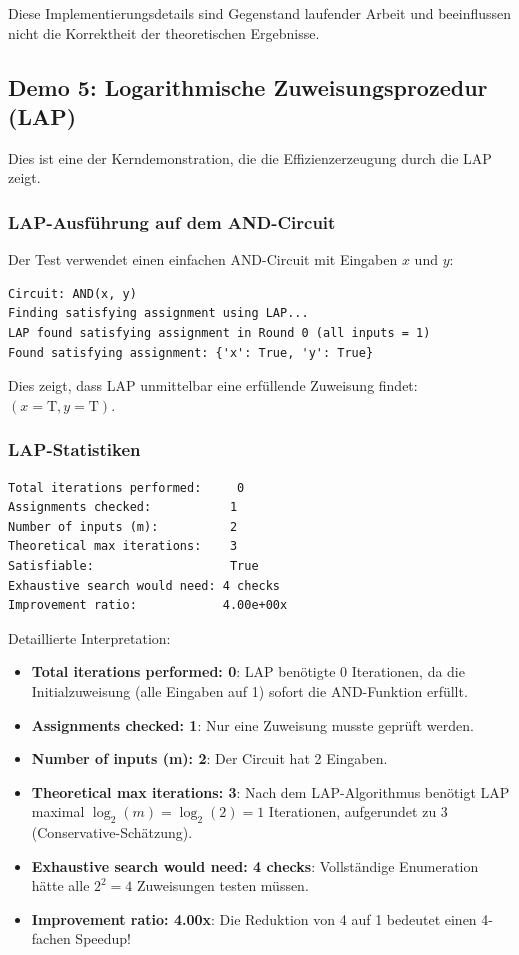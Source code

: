 ﻿\documentclass[a4paper,12pt]{article}
\theoremstyle{definition}
\begin{document}
Diese Implementierungsdetails sind Gegenstand laufender Arbeit und beeinflussen nicht die Korrektheit der theoretischen Ergebnisse.

\subsection{Demo 5: Logarithmische Zuweisungsprozedur (LAP)}

Dies ist eine der Kerndemonstration, die die Effizienzerzeugung durch die LAP zeigt.

\subsubsection{LAP-Ausführung auf dem AND-Circuit}

Der Test verwendet einen einfachen AND-Circuit mit Eingaben $x$ und $y$:

\begin{lstlisting}
Circuit: AND(x, y)
Finding satisfying assignment using LAP...
LAP found satisfying assignment in Round 0 (all inputs = 1)
Found satisfying assignment: {'x': True, 'y': True}
\end{lstlisting}

Dies zeigt, dass LAP unmittelbar eine erfüllende Zuweisung findet: $(x = \text{T}, y = \text{T})$.

\subsubsection{LAP-Statistiken}

\begin{lstlisting}
Total iterations performed:     0
Assignments checked:           1
Number of inputs (m):          2
Theoretical max iterations:    3
Satisfiable:                   True
Exhaustive search would need: 4 checks
Improvement ratio:            4.00e+00x
\end{lstlisting}

Detaillierte Interpretation:

\begin{itemize}
    \item \textbf{Total iterations performed: 0}: LAP benötigte 0 Iterationen, da die Initialzuweisung (alle Eingaben auf 1) sofort die AND-Funktion erfüllt.
    \item \textbf{Assignments checked: 1}: Nur eine Zuweisung musste geprüft werden.
    \item \textbf{Number of inputs (m): 2}: Der Circuit hat 2 Eingaben.
    \item \textbf{Theoretical max iterations: 3}: Nach dem LAP-Algorithmus benötigt LAP maximal $\log_2(m) = \log_2(2) = 1$ Iterationen, aufgerundet zu 3 (Conservative-Schätzung).
    \item \textbf{Exhaustive search would need: 4 checks}: Vollständige Enumeration hätte alle $2^2 = 4$ Zuweisungen testen müssen.
    \item \textbf{Improvement ratio: 4.00x}: Die Reduktion von 4 auf 1 bedeutet einen 4-fachen Speedup!
\end{itemize}
\end{document}
